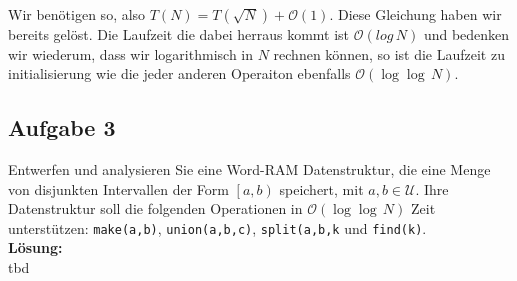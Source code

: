 \documentclass[11pt,a4paper,ngerman]{article}
\begin{document}
Wir benötigen so, also $T(N) = T(\sqrt{N}) + \mathcal{O}(1)$. Diese Gleichung haben wir bereits gelöst. Die Laufzeit die dabei herraus kommt ist $\mathcal{O}(log \, N)$ und bedenken wir wiederum, dass wir logarithmisch in $N$ rechnen können, so ist die Laufzeit zu initialisierung wie die jeder anderen Operaiton ebenfalls $\mathcal{O}(\log \log \, N)$.

\subsection*{Aufgabe 3}

Entwerfen und analysieren Sie eine Word-RAM Datenstruktur, die eine Menge von disjunkten Intervallen der Form $\left[a,b\right)$ speichert, mit $a,b \in \mathcal{U}$. Ihre Datenstruktur soll die folgenden Operationen in $\mathcal{O}(\log\log \, N)$ Zeit unterstützen: \lstinline|make(a,b)|, \lstinline|union(a,b,c)|, \lstinline|split(a,b,k| und \lstinline|find(k)|.\\

\noindent\textbf{Lösung:}\\

tbd

\label{LastPage}
\end{document}
